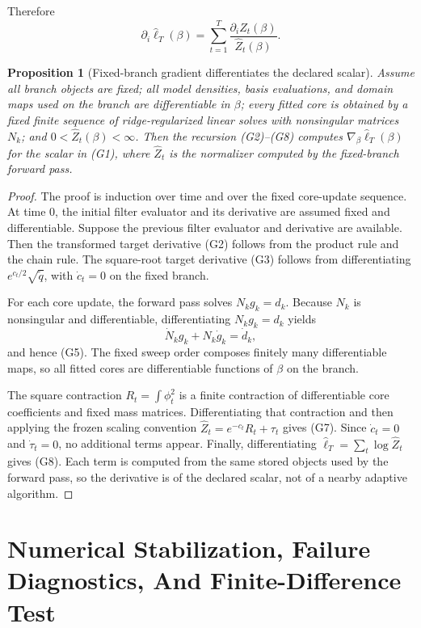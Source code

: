 \documentclass[11pt]{article}
\newtheorem{proposition}{Proposition}
\begin{document}
Therefore
\[
    \partial_i\widehat\ell_T(\beta)
    =
    \sum_{t=1}^T
    \frac{\partial_i\widehat Z_t(\beta)}
    {\widehat Z_t(\beta)}.
    \tag{G8}
\]

\begin{proposition}[Fixed-branch gradient differentiates the declared scalar]
Assume all branch objects are fixed; all model densities, basis evaluations, and
domain maps used on the branch are differentiable in \(\beta\); every fitted
core is obtained by a fixed finite sequence of ridge-regularized linear solves
with nonsingular matrices \(N_k\); and
\(0<\widehat Z_t(\beta)<\infty\).  Then the recursion (G2)--(G8) computes
\(\nabla_\beta\widehat\ell_T(\beta)\) for the scalar in (G1), where
\(\widehat Z_t\) is the normalizer computed by the fixed-branch forward pass.
\end{proposition}

\begin{proof}
The proof is induction over time and over the fixed core-update sequence.  At
time \(0\), the initial filter evaluator and its derivative are assumed fixed
and differentiable.  Suppose the previous filter evaluator and derivative are
available.  Then the transformed target derivative (G2) follows from the
product rule and the chain rule.  The square-root target derivative (G3)
follows from differentiating \(e^{c_t/2}\sqrt{\widetilde q}\), with
\(\dot c_t=0\) on the fixed branch.

For each core update, the forward pass solves \(N_k g_k=d_k\).  Because
\(N_k\) is nonsingular and differentiable, differentiating
\(N_k g_k=d_k\) yields
\[
    \dot N_k g_k+N_k\dot g_k=\dot d_k,
\]
and hence (G5).  The fixed sweep order composes finitely many differentiable
maps, so all fitted cores are differentiable functions of \(\beta\) on the
branch.

The square contraction \(R_t=\int\phi_t^2\) is a finite contraction of
differentiable core coefficients and fixed mass matrices.  Differentiating that
contraction and then applying the frozen scaling convention
\(\widehat Z_t=e^{-c_t}R_t+\tau_t\) gives (G7).  Since
\(\dot c_t=0\) and \(\dot\tau_t=0\), no additional terms appear.  Finally,
differentiating
\(\widehat\ell_T=\sum_t\log\widehat Z_t\) gives (G8).  Each term is computed
from the same stored objects used by the forward pass, so the derivative is of
the declared scalar, not of a nearby adaptive algorithm.
\end{proof}

\section{Numerical Stabilization, Failure Diagnostics, And Finite-Difference Test}
\end{document}
